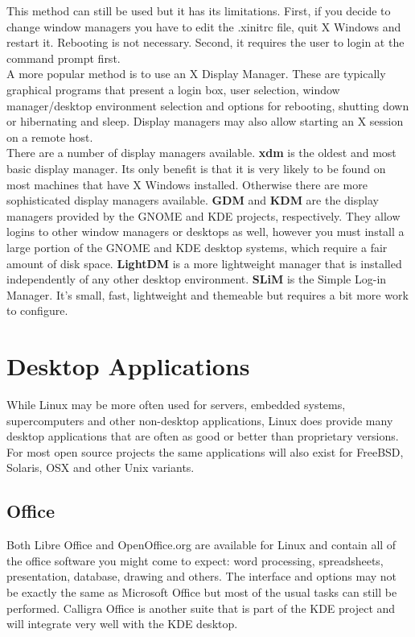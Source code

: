 This method can still be used but it has its limitations.  First, if you decide to change window managers you have to edit the .xinitrc file, quit X Windows and restart it.  Rebooting is not necessary.  Second, it requires the user to login at the command prompt first.\\

A more popular method is to use an X Display Manager.  These are typically graphical programs that present a login box, user selection, window manager/desktop environment selection and options for rebooting, shutting down or hibernating and sleep.  Display managers may also allow starting an X session on a remote host.\\

There are a number of display managers available.  \textbf{xdm} is the oldest and most basic display manager.  Its only benefit is that it is very likely to be found on most machines that have X Windows installed.  Otherwise there are more sophisticated display managers available.  \textbf{GDM} and \textbf{KDM} are the display managers provided by the GNOME and KDE projects, respectively.  They allow logins to other window managers or desktops as well, however you must install a large portion of the GNOME and KDE desktop systems, which require a fair amount of disk space.  \textbf{LightDM} is a more lightweight manager that is installed independently of any other desktop environment.  \textbf{SLiM} is the Simple Log-in Manager.  It's small, fast, lightweight and themeable but requires a bit more work to configure.

\section{Desktop Applications}

While Linux may be more often used for servers, embedded systems, supercomputers and other non-desktop applications, Linux does provide many desktop applications that are often as good or better than proprietary versions.  For most open source projects the same applications will also exist for FreeBSD, Solaris, OSX and other Unix variants.

\subsection{Office}

Both Libre Office and OpenOffice.org are available for Linux and contain all of the office software you might come to expect: word processing, spreadsheets, presentation, database, drawing and others.  The interface and options may not be exactly the same as Microsoft Office but most of the usual tasks can still be performed. Calligra Office is another suite that is part of the KDE project and will integrate very well with the KDE desktop.\\

